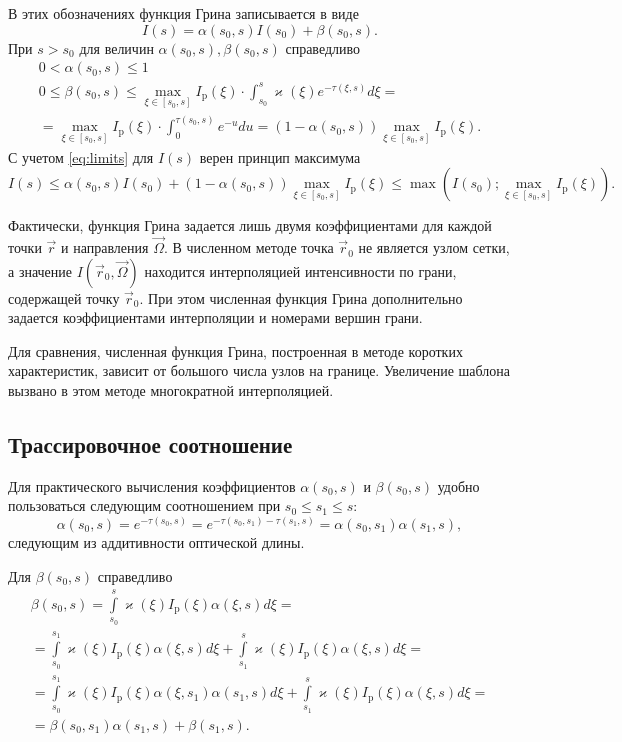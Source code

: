 В этих обозначениях функция Грина записывается в виде
\begin{equation}
I(s) = \alpha(s_0, s) I(s_0) + \beta(s_0, s).
\label{eq:connection}
\end{equation}
При $s > s_0$ для величин $\alpha(s_0, s), \beta(s_0, s)$ справедливо
\begin{equation}
\begin{gathered}
0 < \alpha(s_0, s) \leqslant 1\\
0 \leqslant \beta(s_0, s) \leqslant \max_{\xi \in [s_0, s]} I_\text{p}(\xi)
\cdot \int_{s_0}^s \varkappa(\xi) e^{-\tau(\xi, s)} d\xi = \\ =
\max_{\xi \in [s_0, s]} I_\text{p}(\xi)
\cdot \int_{0}^{\tau(s_0,s)} e^{-u} du =
(1 - \alpha(s_0, s))\max_{\xi \in [s_0, s]} I_\text{p}(\xi).
\end{gathered}
\label{eq:limits}
\end{equation}
С учетом \eqref{eq:limits} для $I(s)$ верен принцип максимума
\[
I(s) \leqslant \alpha(s_0, s) I(s_0) + (1 - \alpha(s_0, s))\max_{\xi \in [s_0, s]} I_\text{p}(\xi) \leqslant \max\left(I(s_0); \max_{\xi \in [s_0, s]} I_\text{p}(\xi)\right).
\]

Фактически, функция Грина задается лишь двумя коэффициентами для каждой точки $\vec r$ и направления $\vec \Omega$. В численном методе точка $\vec r_0$ не является узлом сетки, а значение $I(\vec r_0, \vec \Omega)$ находится интерполяцией интенсивности по грани, содержащей точку $\vec r_0$. При этом численная функция Грина дополнительно задается коэффициентами интерполяции и номерами вершин грани.

Для сравнения, численная функция Грина, построенная в методе коротких характеристик, зависит от большого числа узлов на границе. Увеличение шаблона вызвано в этом методе многократной интерполяцией.

\subsection{Трассировочное соотношение}

Для практического вычисления коэффициентов $\alpha(s_0, s)$ и $\beta(s_0, s)$ удобно пользоваться следующим соотношением при $s_0 \leq s_1 \leq s$:
\[
\alpha(s_0, s) = e^{-\tau(s_0, s)} = 
e^{-\tau(s_0, s_1) -\tau(s_1, s)} = 
\alpha(s_0, s_1)\alpha(s_1, s),
\]
следующим из аддитивности оптической длины.

Для $\beta(s_0, s)$ справедливо
\begin{multline*}
\beta(s_0, s) = 
\int\limits_{s_0}^s \varkappa(\xi) I_\text{p}(\xi) \alpha(\xi, s) d\xi = \\ =
\int\limits_{s_0}^{s_1} \varkappa(\xi) I_\text{p}(\xi) \alpha(\xi, s) d\xi +
\int\limits_{s_1}^s \varkappa(\xi) I_\text{p}(\xi) \alpha(\xi, s) d\xi = \\ =
\int\limits_{s_0}^{s_1} \varkappa(\xi) I_\text{p}(\xi) \alpha(\xi, s_1) \alpha(s_1, s) d\xi +
\int\limits_{s_1}^s \varkappa(\xi) I_\text{p}(\xi) \alpha(\xi, s) d\xi = \\
= \beta(s_0, s_1) \alpha(s_1, s) + \beta(s_1, s).
\end{multline*}

